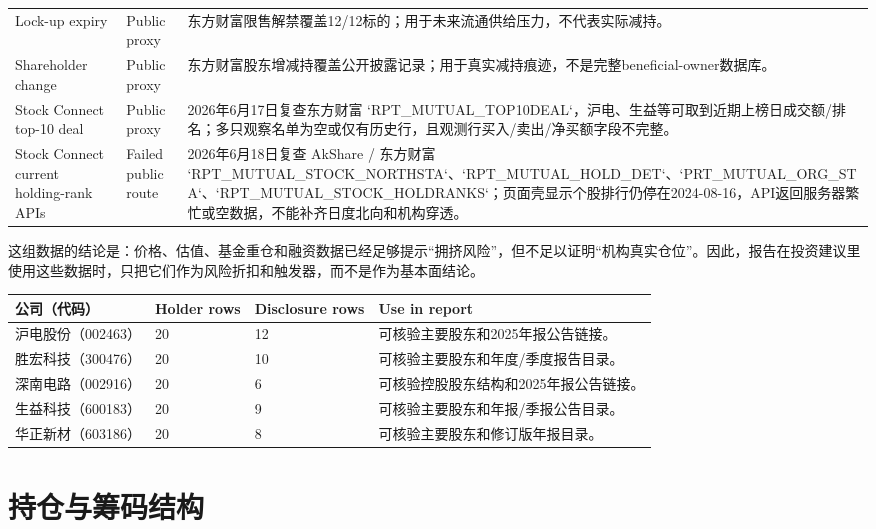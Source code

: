 \begin{exhibitbox}
\begin{tabularx}{\textwidth}{L{3cm}L{2.5cm}X}
Lock-up expiry & Public proxy & 东方财富限售解禁覆盖12/12标的；用于未来流通供给压力，不代表实际减持。 \\
Shareholder change & Public proxy & 东方财富股东增减持覆盖公开披露记录；用于真实减持痕迹，不是完整beneficial-owner数据库。 \\
Stock Connect top-10 deal & Public proxy & 2026年6月17日复查东方财富 `RPT\_MUTUAL\_TOP10DEAL`，沪电、生益等可取到近期上榜日成交额/排名；多只观察名单为空或仅有历史行，且观测行买入/卖出/净买额字段不完整。 \\
Stock Connect current holding-rank APIs & Failed public route & 2026年6月18日复查 AkShare / 东方财富 `RPT\_MUTUAL\_STOCK\_NORTHSTA`、`RPT\_MUTUAL\_HOLD\_DET`、`PRT\_MUTUAL\_ORG\_STA`、`RPT\_MUTUAL\_STOCK\_HOLDRANKS`；页面壳显示个股排行仍停在2024-08-16，API返回服务器繁忙或空数据，不能补齐日度北向和机构穿透。 \\
\bottomrule
\end{tabularx}
\end{exhibitbox}

这组数据的结论是：价格、估值、基金重仓和融资数据已经足够提示“拥挤风险”，但不足以证明“机构真实仓位”。因此，报告在投资建议里使用这些数据时，只把它们作为风险折扣和触发器，而不是作为基本面结论。

\begin{exhibitbox}
\small
\begin{tabularx}{\textwidth}{L{2.0cm}R{1.8cm}R{2.0cm}X}
\toprule
\textbf{公司（代码）} & \textbf{Holder rows} & \textbf{Disclosure rows} & \textbf{Use in report} \\
\midrule
沪电股份（002463） & 20 & 12 & 可核验主要股东和2025年报公告链接。 \\
胜宏科技（300476） & 20 & 10 & 可核验主要股东和年度/季度报告目录。 \\
深南电路（002916） & 20 & 6 & 可核验控股股东结构和2025年报公告链接。 \\
生益科技（600183） & 20 & 9 & 可核验主要股东和年报/季报公告目录。 \\
华正新材（603186） & 20 & 8 & 可核验主要股东和修订版年报目录。 \\
\bottomrule
\end{tabularx}
\end{exhibitbox}

\section{持仓与筹码结构}

